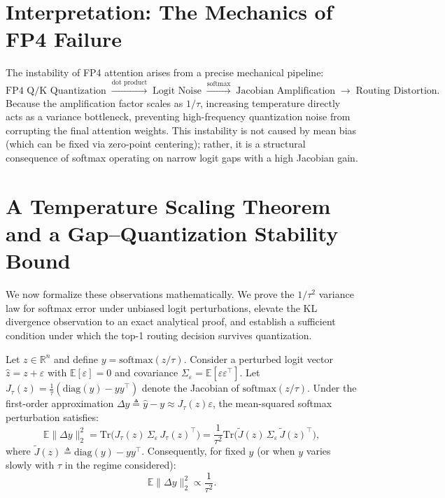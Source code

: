 \section{Interpretation: The Mechanics of FP4 Failure}

The instability of FP4 attention arises from a precise mechanical pipeline:
\[
\text{FP4 Q/K Quantization} \;\xrightarrow{\text{dot product}}\; \text{Logit Noise} \;\xrightarrow{\text{softmax}}\; \text{Jacobian Amplification} \;\rightarrow\; \text{Routing Distortion.}
\]
Because the amplification factor scales as $1/\tau$, increasing temperature directly acts as a variance bottleneck, preventing high-frequency quantization noise from corrupting the final attention weights. This instability is not caused by mean bias (which can be fixed via zero-point centering); rather, it is a structural consequence of softmax operating on narrow logit gaps with a high Jacobian gain.

\section{A Temperature Scaling Theorem and a Gap--Quantization Stability Bound}
\label{subsec:tau_gap_bounds}

We now formalize these observations mathematically. We prove the $1/\tau^2$ variance law for softmax error under unbiased logit perturbations, elevate the KL divergence observation to an exact analytical proof, and establish a sufficient condition under which the top-1 routing decision survives quantization.

\begin{theorem}
\label{thm:softmax_tau_sq}
Let $z\in\mathbb{R}^n$ and define $y=\mathrm{softmax}(z/\tau)$. Consider a perturbed logit vector $\hat z = z + \varepsilon$ with $\mathbb{E}[\varepsilon]=0$ and covariance $\Sigma_\varepsilon = \mathbb{E}[\varepsilon\varepsilon^\top]$. 
Let $J_\tau(z) = \frac{1}{\tau}\left(\mathrm{diag}(y) - yy^\top\right)$ denote the Jacobian of $\mathrm{softmax}(z/\tau)$. Under the first-order approximation $\Delta y \triangleq \hat y - y \approx J_\tau(z)\varepsilon$, the mean-squared softmax perturbation satisfies:
\begin{equation}
\mathbb{E}\|\Delta y\|_2^2
=
\mathrm{Tr}\!\big(J_\tau(z)\,\Sigma_\varepsilon\,J_\tau(z)^\top\big)
=
\frac{1}{\tau^2}
\mathrm{Tr}\!\big(\widetilde J(z)\,\Sigma_\varepsilon\,\widetilde J(z)^\top\big),
\label{eq:tau_sq_exact_trace}
\end{equation}
where $\widetilde J(z) \triangleq \mathrm{diag}(y) - yy^\top$. Consequently, for fixed $y$ (or when $y$ varies slowly with $\tau$ in the regime considered):
\begin{equation}
\mathbb{E}\|\Delta y\|_2^2 \propto \frac{1}{\tau^2}.
\label{eq:tau_sq_scaling}
\end{equation}
\end{theorem}

